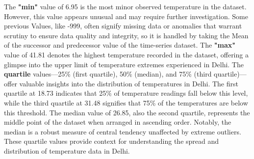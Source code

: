 The \textbf{"min"} value of 6.95 is the most minor observed temperature in the dataset. However, this value appears unusual and may require further investigation. Some previous Values, like -999, often signify missing data or anomalies that warrant scrutiny to ensure data quality and integrity, so it is handled by taking the Mean of the successor and predecessor value of the time-series dataset. The \textbf{"max"} value of 41.81 denotes the highest temperature recorded in the dataset, offering a glimpse into the upper limit of temperature extremes experienced in Delhi. The \textbf{quartile} values—25\% (first quartile), 50\% (median), and 75\% (third quartile)—offer valuable insights into the distribution of temperatures in Delhi. The first quartile at 18.73 indicates that 25\% of temperature readings fall below this level, while the third quartile at 31.48 signifies that 75\% of the temperatures are below this threshold. The median value of 26.85, also the second quartile, represents the middle point of the dataset when arranged in ascending order. Notably, the median is a robust measure of central tendency unaffected by extreme outliers. These quartile values provide context for understanding the spread and distribution of temperature data in Delhi.



